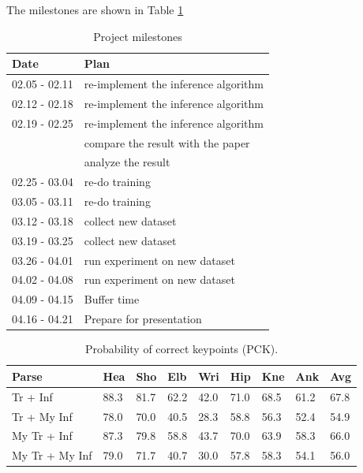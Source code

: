 \documentclass[10pt,twocolumn,letterpaper]{article}
\begin{document}
The milestones are shown in Table \ref{tab:6}
\begin{table}[t]
  \centering
  \begin{tabular}{|l|p{5.5 cm}|}
    \hline
    Date          & Plan \\
    \hline
    02.05 - 02.11 & re-implement the inference algorithm \\
    02.12 - 02.18 & re-implement the inference algorithm \\
    02.19 - 02.25 & re-implement the inference algorithm \\
                  & compare the result with the paper \\
                  & analyze the result \\
    02.25 - 03.04 & re-do training \\
    03.05 - 03.11 & re-do training \\
    03.12 - 03.18 & collect new dataset \\
    03.19 - 03.25 & collect new dataset \\
    03.26 - 04.01 & run experiment on new dataset \\
    04.02 - 04.08 & run experiment on new dataset \\
    04.09 - 04.15 & Buffer time \\
    04.16 - 04.21 & Prepare for presentation \\
    \hline
  \end{tabular}
  \caption{Project milestones}
  \label{tab:6}
\end{table}

\begin{table}[t]
  \begin{center}
    \begin{tabular}{|p{2.2cm}|p{0.5cm}|p{0.5cm}|p{0.5cm}|p{0.5cm}|p{0.5cm}|p{0.5cm}|p{0.5cm}||p{0.5cm}|}
      \hline
      Parse                	                         & Hea  & Sho  & Elb  & Wri  & Hip  & Kne  & Ank  & Avg  \\ \hline
      \hline
      \cite{Yang_PAMI2011} Tr + \cite{Yang_PAMI2011} Inf & 88.3 & 81.7 & 62.2 & 42.0 & 71.0 & 68.5 & 61.2 & 67.8 \\ \hline
      \cite{Yang_PAMI2011} Tr + My Inf                   & 78.0 & 70.0 & 40.5 & 28.3 & 58.8 & 56.3 & 52.4 & 54.9 \\ \hline
      \hline
      My Tr + \cite{Yang_PAMI2011} Inf			 & 87.3 & 79.8 & 58.8 & 43.7 & 70.0 & 63.9 & 58.3 & 66.0 \\ \hline
      My Tr + My Inf			 		 & 79.0 & 71.7 & 40.7 & 30.0 & 57.8 & 58.3 & 54.1 & 56.0 \\ \hline
    \end{tabular}
  \end{center}
  \caption{Probability of correct keypoints (PCK).}
\end{table}
\end{document}
